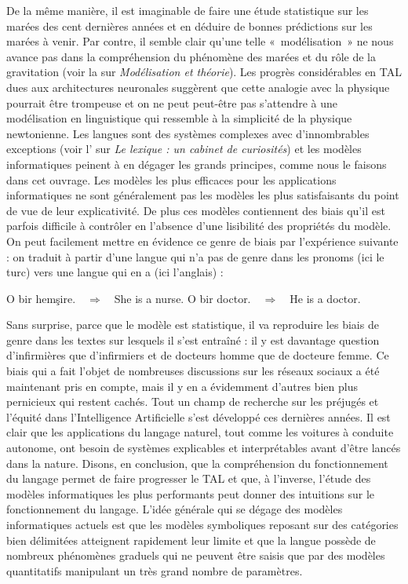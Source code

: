 De la même manière, il est imaginable de faire une étude statistique sur les marées des cent dernières années et en déduire de bonnes prédictions sur les marées à venir. Par contre, il semble clair qu’une telle «~modélisation~» ne nous avance pas dans la compréhension du phénomène des marées et du rôle de la gravitation (voir la  sur \textit{Modélisation et théorie}). Les progrès considérables en TAL dues aux architectures neuronales suggèrent que cette analogie avec la physique pourrait être trompeuse et on ne peut peut-être pas s’attendre à une modélisation en linguistique qui ressemble à la simplicité de la physique newtonienne. Les langues sont des systèmes complexes avec d’innombrables exceptions (voir l’ sur \textit{Le lexique : un cabinet de curiosités}) et les modèles informatiques peinent à en dégager les grands principes, comme nous le faisons dans cet ouvrage. Les modèles les plus efficaces pour les applications informatiques ne sont généralement pas les modèles les plus satisfaisants du point de vue de leur explicativité. De plus ces modèles contiennent des biais qu’il est parfois difficile à contrôler en l’absence d’une lisibilité des propriétés du modèle. On peut facilement mettre en évidence ce genre de biais par l’expérience suivante : on traduit à partir d’une langue qui n’a pas de genre dans les pronoms  (ici le turc) vers une langue qui en a (ici l’anglais) :

\ea
\ea O bir hemşire.\ \ $\Longrightarrow$\ \ She is a nurse. \z
\ex O bir doctor.\ \ $\Longrightarrow$\ \ He is a doctor.\z
\z

Sans surprise, parce que le modèle est statistique, il va reproduire les biais de genre dans les textes sur lesquels il s’est entraîné : il y est davantage question d’infirmières que d’infirmiers et de docteurs homme que de docteure femme. Ce biais qui a fait l’objet de nombreuses discussions sur les réseaux sociaux a été maintenant pris en compte, mais il y en a évidemment d’autres bien plus pernicieux qui restent cachés. Tout un champ de recherche sur les préjugés et l'équité dans l'Intelligence Artificielle s'est développé ces dernières années. Il est clair que les applications du langage naturel, tout comme les voitures à conduite autonome, ont besoin de systèmes explicables et interprétables avant d'être lancés dans la nature. 
Disons, en conclusion, que la compréhension du fonctionnement du langage permet de faire progresser le TAL et que, à l’inverse, l’étude des modèles informatiques les plus performants peut donner des intuitions sur le fonctionnement du langage. L’idée générale qui se dégage des modèles informatiques actuels est que les modèles symboliques reposant sur des catégories bien délimitées atteignent rapidement leur limite et que la langue possède de nombreux phénomènes graduels qui ne peuvent être saisis que par des modèles quantitatifs manipulant un très grand nombre de paramètres.


